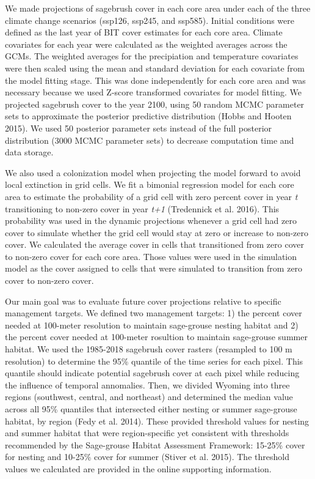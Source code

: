 \documentclass[
  12pt,
]{article}
\begin{document}
We made projections of sagebrush cover in each core area under each of the three climate change scenarios (ssp126, ssp245, and ssp585).
Initial conditions were defined as the last year of BIT cover estimates for each core area.
Climate covariates for each year were calculated as the weighted averages across the GCMs.
The weighted averages for the precipiation and temperature covariates were then scaled using the mean and standard deviation for each covariate from the model fitting stage.
This was done independently for each core area and was necessary because we used Z-score transformed covariates for model fitting.
We projected sagebrush cover to the year 2100, using 50 random MCMC parameter sets to approximate the posterior predictive distribution (Hobbs and Hooten 2015).
We used 50 posterior parameter sets instead of the full posterior distribution (3000 MCMC parameter sets) to decrease computation time and data storage.

We also used a colonization model when projecting the model forward to avoid local extinction in grid cells.
We fit a bimonial regression model for each core area to estimate the probability of a grid cell with zero percent cover in year \emph{t} transitioning to non-zero cover in year \emph{t+1} (Tredennick et al. 2016).
This probability was used in the dynamic projections whenever a grid cell had zero cover to simulate whether the grid cell would stay at zero or increase to non-zero cover.
We calculated the average cover in cells that transitioned from zero cover to non-zero cover for each core area.
Those values were used in the simulation model as the cover assigned to cells that were simulated to transition from zero cover to non-zero cover.

Our main goal was to evaluate future cover projections relative to specific management targets.
We defined two management targets: 1) the percent cover needed at 100-meter resolution to maintain sage-grouse nesting habitat and 2) the percent cover needed at 100-meter rosultion to maintain sage-grouse summer habitat.
We used the 1985-2018 sagebrush cover rasters (resampled to 100 m resolution) to determine the 95\% quantile of the time series for each pixel.
This quantile should indicate potential sagebrush cover at each pixel while reducing the influence of temporal annomalies.
Then, we divided Wyoming into three regions (southwest, central, and northeast) and determined the median value across all 95\% quantiles that intersected either nesting or summer sage-grouse habitat, by region (Fedy et al. 2014).
These provided threshold values for nesting and summer habitat that were region-specific yet consistent with thresholds recommended by the Sage-grouse Habitat Assessment Framework: 15-25\% cover for nesting and 10-25\% cover for summer (Stiver et al. 2015).
The threshold values we calculated are provided in the online supporting information.
\end{document}
